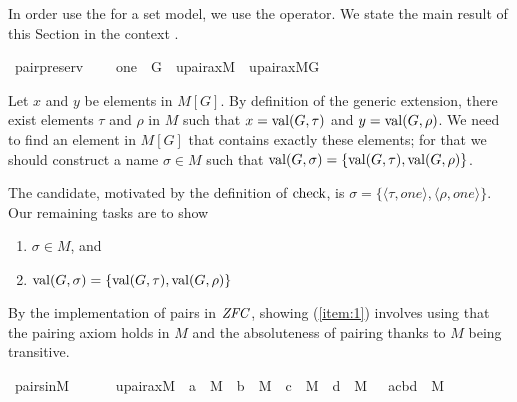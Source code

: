 In order use the  for a set model, we
use the \isatt{\#\#}  operator.  We state the main result of this
Section in the context .  
%
\begin{isabelle}
\isamarkupfalse%
\ pair{\isacharunderscore}preserv\ {\isacharcolon}\ \isanewline
\ \ {\isachardoublequoteopen}one\ {\isasymin}\ G\ {\isasymLongrightarrow}\ upair{\isacharunderscore}ax{\isacharparenleft}{\isacharhash}{\isacharhash}M{\isacharparenright}\ {\isasymLongrightarrow}\ upair{\isacharunderscore}ax{\isacharparenleft}{\isacharhash}{\isacharhash}M{\isacharbrackleft}G{\isacharbrackright}{\isacharparenright}{\isachardoublequoteclose}
\end{isabelle}

Let $x$ and $y$ be elements in $M[G]$. By definition of the generic extension, there exist
elements $\tau$ and $\rho$ in $M$ such that $x = \operatorname{val}(G,\tau)$ and
$y = \operatorname{val}(G,\rho)$.  We need to find an element in $M[G]$ that contains exactly
these elements; for that we should construct a name $\sigma\in M$ such that
$\operatorname{val}(G,\sigma) = \{ \operatorname{val}(G,\tau) , \operatorname{val}(G,\rho) \}$. 

The candidate, motivated by the definition of $\operatorname{check}$,  is
$\sigma = \{\langle \tau , one \rangle , \langle \rho , one \rangle \}$. 
Our remaining tasks are to show 
\begin{enumerate}
  \item \label{item:1}$\sigma \in M$, and
  \item \label{item:2} $\operatorname{val}(G,\sigma) = \{ \operatorname{val}(G,\tau) , \operatorname{val}(G,\rho) \}$
\end{enumerate}

By the implementation of pairs  in $\mathit{ZFC}$, showing (\ref{item:1})
involves using that the
pairing axiom holds in $M$ and the absoluteness of pairing
thanks to $M$ being transitive. 

\begin{isabelle}
\isamarkupfalse%
\ pairs{\isacharunderscore}in{\isacharunderscore}M\ {\isacharcolon}\ \isanewline
\ \ {\isachardoublequoteopen}\ {\isasymlbrakk}\ upair{\isacharunderscore}ax{\isacharparenleft}{\isacharhash}{\isacharhash}M{\isacharparenright}\ {\isacharsemicolon}\ a\ {\isasymin}\ M\ {\isacharsemicolon}\ b\ {\isasymin}\ M\ {\isacharsemicolon}\ c\ {\isasymin}\ M\ {\isacharsemicolon}\ d\ {\isasymin}\ M\ {\isasymrbrakk}\ {\isasymLongrightarrow}\ {\isacharbraceleft}{\isasymlangle}a{\isacharcomma}c{\isasymrangle}{\isacharcomma}{\isasymlangle}b{\isacharcomma}d{\isasymrangle}{\isacharbraceright}\ {\isasymin}\ M{\isachardoublequoteclose}
\end{isabelle}

